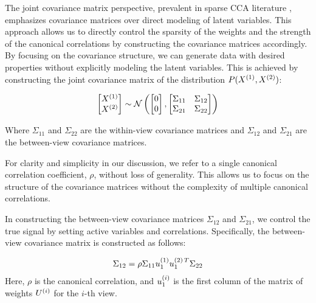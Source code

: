 The joint covariance matrix perspective, prevalent in sparse CCA literature \citep{suo2017sparse,chen2013sparse}, emphasizes covariance matrices over direct modeling of latent variables.
This approach allows us to directly control the sparsity of the weights and the strength of the canonical correlations by constructing the covariance matrices accordingly. By focusing on the covariance structure, we can generate data with desired properties without explicitly modeling the latent variables.
This is achieved by constructing the joint covariance matrix of the distribution \(P(X^{(1)},X^{(2)})\):

\begin{align}
    \begin{bmatrix}
        X^{(1)} \\ X^{(2)}
    \end{bmatrix} \sim \mathcal{N} \left( \begin{bmatrix}
                                              0 \\ 0
    \end{bmatrix}, \begin{bmatrix}
                       \Sigma_{11} & \Sigma_{12} \\ \Sigma_{21} & \Sigma_{22}
    \end{bmatrix} \right)
\end{align}

Where \(\Sigma_{11}\) and \(\Sigma_{22}\) are the within-view covariance matrices and \(\Sigma_{12}\) and \(\Sigma_{21}\) are the between-view covariance matrices.

For clarity and simplicity in our discussion, we refer to a single canonical correlation coefficient, \(\rho\), without loss of generality.
This allows us to focus on the structure of the covariance matrices without the complexity of multiple canonical correlations.

In constructing the between-view covariance matrices \(\Sigma_{12}\) and \(\Sigma_{21}\), we control the true signal by setting active variables and correlations.
Specifically, the between-view covariance matrix is constructed as follows:

\begin{align}
    \Sigma_{12} = \rho \Sigma_{11} u^{(1)}_{1} u^{(2)\,T}_{1} \Sigma_{22}
\end{align}
%
Here, \(\rho\) is the canonical correlation, and \(u^{(i)}_{1}\) is the first column of the matrix of weights \(U^{(i)}\) for the \(i\)-th view.

